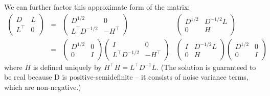 We can further factor this approximate form of the matrix:
\[
\begin{array}{cccc}
\begin{pmatrix}
D & L\\
L^\top & 0
\end{pmatrix}
&=&
\begin{pmatrix}
D^{1/2} & 0\\
L^\top D^{-1/2} & -H^\top
\end{pmatrix}
&
\begin{pmatrix}
D^{1/2} & D^{-1/2}L\\
0 & H
\end{pmatrix}\\[1em]
&=&

\begin{pmatrix}
D^{1/2} & 0\\
0 & I
\end{pmatrix}
\begin{pmatrix}
I & 0\\
L^\top D^{-1/2} & -H^\top
\end{pmatrix}
&
\begin{pmatrix}
I & D^{-1/2}L\\
0 & H
\end{pmatrix}
\begin{pmatrix}
D^{1/2} & 0\\
0 & I
\end{pmatrix}

\end{array}
\]
where $H$ is defined uniquely by $H^\top H = L^\top D^{-1} L$.  (The solution is guaranteed to be real because D is positive-semidefinite -- it consists of noise variance terms, which are non-negative.)

